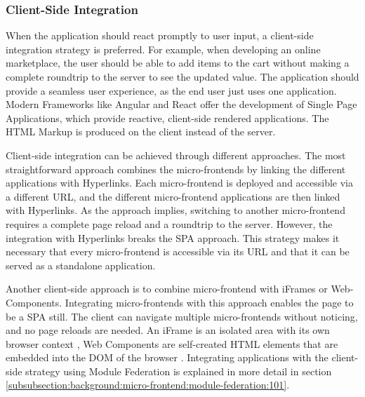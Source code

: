 \subsubsection{Client-Side Integration}\label{subsubsection:background:micro-frontend-architecture:integration-strategies:client-side-integration}

When the application should react promptly to user input, a client-side integration strategy is preferred. For example, when developing an online marketplace, the user should be able to add items to the cart without making a complete roundtrip to the server to see the updated value. The application should provide a seamless user experience, as the end user just uses one application. Modern Frameworks like Angular and React offer the development of Single Page Applications, which provide reactive, client-side rendered applications. The HTML Markup is produced on the client instead of the server. \cite{book:2020:geers:background:micro-frontends:micro-frontends-in-action}

\bigskip

\noindent Client-side integration can be achieved through different approaches. The most straightforward approach combines the micro-frontends by linking the different applications with Hyperlinks. Each micro-frontend is deployed and accessible via a different URL, and the different micro-frontend applications are then linked with Hyperlinks. As the approach implies, switching to another micro-frontend requires a complete page reload and a roundtrip to the server. However, the integration with Hyperlinks breaks the SPA approach. This strategy makes it necessary that every micro-frontend is accessible via its URL and that it can be served as a standalone application.

\bigskip

\noindent Another client-side approach is to combine micro-frontend with iFrames or Web-Components. Integrating micro-frontends with this approach enables the page to be a SPA still. The client can navigate multiple micro-frontends without noticing, and no page reloads are needed. An iFrame is an isolated area with its own browser context \cite[35]{book:2020:geers:background:micro-frontends:micro-frontends-in-action}, Web Components are self-created HTML elements that are embedded into the DOM of the browser \cite[103]{book:2019:farrell:background:micro-frontends:web-components-in-action}. Integrating applications with the client-side strategy using Module Federation is explained in more detail in section \ref{subsubsection:background:micro-frontend:module-federation:101}.
